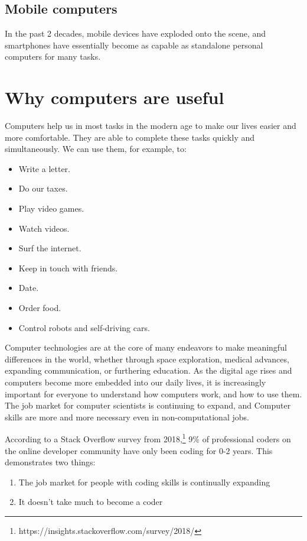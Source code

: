 \subsection{Mobile computers}
In the past 2 decades, mobile devices have exploded onto the scene, and smartphones have essentially become as capable as standalone personal computers for many tasks.

\section{Why computers are useful}

Computers help us in most tasks in the modern age to make our lives easier and more comfortable. They are able to complete these tasks quickly and simultaneously. We can use them, for example, to:

\begin{itemize}
	\item Write a letter.
	\item Do our taxes.
	\item Play video games.
	\item Watch videos.
	\item Surf the internet.
	\item Keep in touch with friends.
	\item Date.
	\item Order food.
	\item Control robots and self-driving cars.
\end{itemize}

Computer technologies are at the core of many endeavors to make meaningful differences in the world, whether through space exploration, medical advances, expanding communication, or furthering education. As the digital age rises and computers become more embedded into our daily lives, it is increasingly important for everyone to understand how computers work, and how to use them. The job market for computer scientists is continuing to expand, and Computer skills are more and more necessary even in non-computational jobs.

According to a Stack Overflow survey from 2018,\footnote{https://insights.stackoverflow.com/survey/2018/} 9\% of professional coders on the online developer community have only been coding for 0-2 years. This demonstrates two things:

\begin{enumerate}
	\item The job market for people with coding skills is continually expanding
	\item It doesn't take much to become a coder
\end{enumerate}

